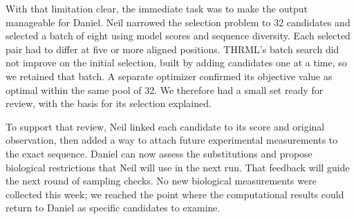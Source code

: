 \documentclass[11pt,letterpaper]{article}
\begin{document}
With that limitation clear, the immediate task was to make the output manageable for Daniel. Neil narrowed the selection problem to 32 candidates and selected a batch of eight using model scores and sequence diversity. Each selected pair had to differ at five or more aligned positions. THRML's batch search did not improve on the initial selection, built by adding candidates one at a time, so we retained that batch. A separate optimizer confirmed its objective value as optimal within the same pool of 32. We therefore had a small set ready for review, with the basis for its selection explained.

To support that review, Neil linked each candidate to its score and original observation, then added a way to attach future experimental measurements to the exact sequence. Daniel can now assess the substitutions and propose biological restrictions that Neil will use in the next run. That feedback will guide the next round of sampling checks. No new biological measurements were collected this week; we reached the point where the computational results could return to Daniel as specific candidates to examine.
\end{document}
